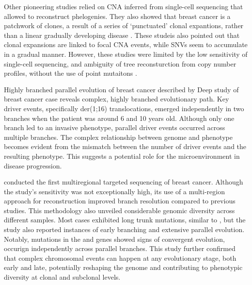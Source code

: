 Other pioneering studies relied on \ac{CNA} inferred from single-cell sequencing that allowed to reconstruct phelogenies. They also showed that breast cancer is a patchwork of clones, a result of a series of `punctuated' clonal expantions, rather than a linear gradually developing disease \parencite{Navin2011-qq,Wang2014-bp,Gao2016-qv}. These studeis also pointed out that clonal expansions are linked to focal \ac{CNA} events, while \acp{SNV} seem to accumulate in a gradual manner. However, these studies were limited by the low sensitivity of single-cell sequencing, and ambiguity of tree reconsturction from copy number profiles, without the use of point mutaitons .

{Highly branched parallel evolution of breast cancer described by \textcite{Nishimura2023-mk}}
{Deep study of breast cancer case reveals complex, highly branched evolutionary path. Key driver events, specifically der(1;16) translocations, emerged independently in two branches when the patient was around 6 and 10 years old. Although only one branch led to an invasive phenotype, parallel driver events occurred across multiple branches. The complex relationship between genome and phenotype becomes evident from the mismatch between the number of driver events and the resulting phenotype. This suggests a potential role for the microenvironment in disease progression. }

\textcite{Yates2015-xk} conducted the first multiregional targeted sequencing of breast cancer. Although the study's sensitivity was not exceptionally high, its use of a multi-region approach for reconstruction improved branch resolution compared to previous studies. This methodology also unveiled considerable genomic diversity across different samples. Most cases exhibited long trunk mutations, similar to \textcite{Nik-Zainal2012-zz}, but the study also reported instances of early branching and extensive parallel evolution. Notably, mutations in the  and  genes showed signs of convergent evolution, occurign independently across parallel branches. This study further confirmed that complex chromosomal events can happen at any evolutionary stage, both early and late, potentially reshaping the genome and contributing to phenotypic diversity at clonal and subclonal levels.

